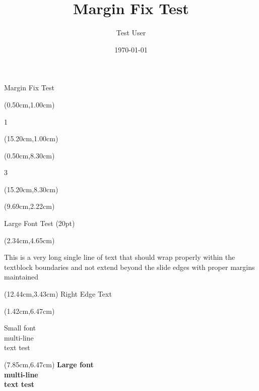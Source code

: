 \documentclass[aspectratio=169,xcolor=dvipsnames,professionalfonts]{beamer}
\title{Margin Fix Test}
\author{Test User}
\date{\today}
\begin{document}
\begin{frame}
\titlepage
\end{frame}

\begin{frame}{Margin Fix Test}

\begin{textblock*}{1.00cm}(0.50cm,1.00cm)
{\fontsize{12}{14.399999999999999}\selectfont\raggedright 1}
\end{textblock*}

\begin{textblock*}{0.80cm}(15.20cm,1.00cm)
{\fontsize{12}{14.399999999999999}\selectfont{}}
\end{textblock*}

\begin{textblock*}{1.00cm}(0.50cm,8.30cm)
{\fontsize{12}{14.399999999999999}\selectfont\raggedright 3}
\end{textblock*}

\begin{textblock*}{0.80cm}(15.20cm,8.30cm)
{\fontsize{12}{14.399999999999999}\selectfont{}}
\end{textblock*}

\begin{textblock*}{5.51cm}(9.69cm,2.22cm)
{\fontsize{20}{24}\selectfont\bfseries \raggedright Large Font Test (20pt)}
\end{textblock*}

\begin{textblock*}{12.86cm}(2.34cm,4.65cm)
{\fontsize{14}{16.8}\selectfont\raggedright This is a very long single line of text that should wrap properly within the textblock boundaries and not extend beyond the slide edges with proper margins maintained}
\end{textblock*}

\begin{textblock*}{2.76cm}(12.44cm,3.43cm)
{\fontsize{16}{19.2}\selectfont\raggedleft Right Edge Text}
\end{textblock*}

\begin{textblock*}{3.67cm}(1.42cm,6.47cm)
{\fontsize{10}{12}\selectfont\raggedright Small font\\multi-line\\text test}
\end{textblock*}

\begin{textblock*}{6.06cm}(7.85cm,6.47cm)
{\fontsize{18}{21.599999999999998}\selectfont\bfseries \centering Large font\\multi-line\\text test}
\end{textblock*}
\end{frame}
\end{document}
